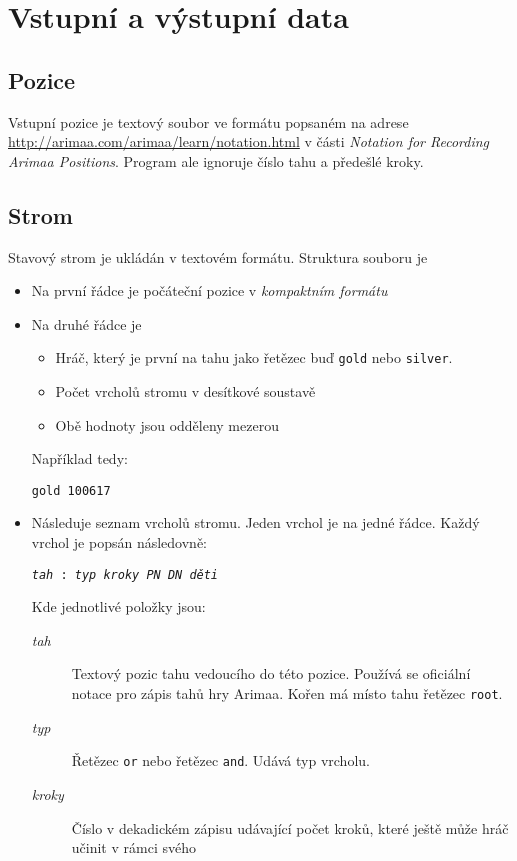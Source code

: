 \documentclass{article}
\begin{document}
\section{Vstupní a výstupní data}
\subsection{Pozice}
Vstupní pozice je textový soubor ve formátu popsaném na adrese \url{http://arimaa.com/arimaa/learn/notation.html} v
části \emph{Notation for Recording Arimaa Positions}. Program ale ignoruje číslo tahu a předešlé kroky.

\subsection{Strom}
Stavový strom je ukládán v textovém formátu. Struktura souboru je \begin{itemize}
  \item Na první řádce je počáteční pozice v \emph{kompaktním formátu}
  \item Na druhé řádce je \begin{itemize}
    \item Hráč, který je první na tahu jako řetězec buď \texttt{gold} nebo \texttt{silver}.
    \item Počet vrcholů stromu v desítkové soustavě
    \item Obě hodnoty jsou odděleny mezerou
  \end{itemize}
  Například tedy: \begin{center}\verb+gold 100617+\end{center}
  \item Následuje seznam vrcholů stromu. Jeden vrchol je na jedné řádce. Každý vrchol je popsán
  následovně: \begin{center}\texttt{\textit{tah} : \textit{typ} \textit{kroky} \textit{PN}
  \textit{DN} \textit{děti}}\end{center}
  Kde jednotlivé položky jsou:\begin{description}
	  \item[\textit{tah}] Textový pozic tahu vedoucího do této pozice. Používá se oficiální notace pro zápis tahů hry
	  Arimaa. Kořen má místo tahu řetězec \texttt{root}.
	  \item[\textit{typ}] Řetězec \texttt{or} nebo řetězec \texttt{and}. Udává typ vrcholu.
	  \item[\textit{kroky}] Číslo v dekadickém zápisu udávající počet kroků, které ještě může hráč učinit v rámci svého

\end{description}
\end{itemize}
\end{document}
